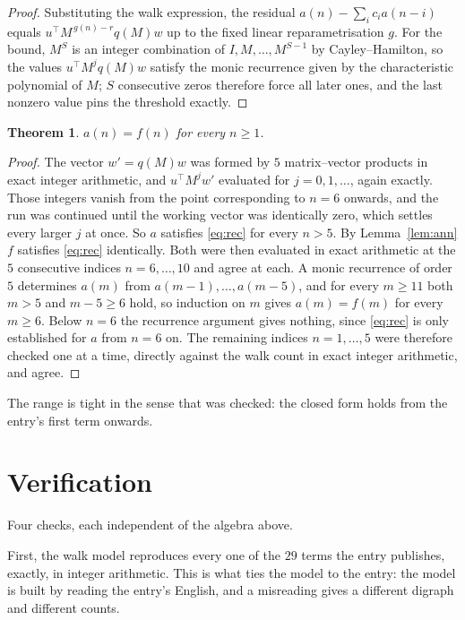 \documentclass[11pt,a4paper]{article}
\theoremstyle{plain}
\newtheorem{theorem}{Theorem}
\theoremstyle{definition}
\begin{document}
\begin{proof}
Substituting the walk expression, the residual $a(n)-\sum_ic_ia(n-i)$ equals
$u^{\!\top}M^{\,g(n)-r}q(M)w$ up to the fixed linear reparametrisation $g$. For the bound,
$M^{S}$ is an integer combination of $I,M,\dots,M^{S-1}$ by Cayley--Hamilton, so the values
$u^{\!\top}M^{j}q(M)w$ satisfy the monic recurrence given by the characteristic polynomial of
$M$; $S$ consecutive zeros therefore force all later ones, and the last nonzero value pins the
threshold exactly.
\end{proof}

\begin{theorem}
$a(n)=f(n)$ for every $n\ge1$.
\end{theorem}

\begin{proof}
The vector $w'=q(M)w$ was formed by $5$ matrix--vector products in exact integer
arithmetic, and $u^{\!\top}M^{j}w'$ evaluated for $j=0,1,\dots$, again exactly. Those integers
vanish from the point corresponding to $n=6$ onwards, and the run was continued until the
working vector was identically zero, which settles every larger $j$ at once. So $a$ satisfies
\eqref{eq:rec} for every $n>5$. By Lemma~\ref{lem:ann} $f$ satisfies \eqref{eq:rec}
identically. Both were then evaluated in exact arithmetic at the $5$ consecutive indices
$n=6,\dots,10$ and agree at each. A monic recurrence of order $5$
determines $a(m)$ from $a(m-1),\dots,a(m-5)$, and for every $m\ge11$ both
$m>5$ and $m-5\ge6$ hold, so induction on $m$ gives $a(m)=f(m)$ for every
$m\ge6$.
Below $n=6$ the recurrence argument gives nothing, since \eqref{eq:rec} is only
established for $a$ from $n=6$ on. The remaining indices $n=1,\dots,5$ were
therefore checked one at a time, directly against the walk count in exact integer arithmetic,
and agree.
\end{proof}

The range is tight in the sense that was checked: the closed form holds from the entry's first term onwards.

\section{Verification}

Four checks, each independent of the algebra above.

First, the walk model reproduces every one of the $29$ terms the entry publishes,
exactly, in integer arithmetic. This is what ties the model to the entry: the model is built
by reading the entry's English, and a misreading gives a different digraph and different
counts.
\end{document}
